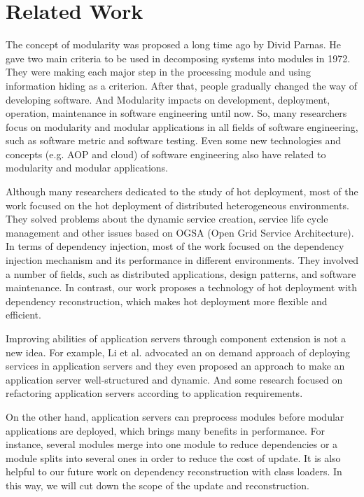 \documentclass[conference]{IEEEtran}
\begin{document}
\section{Related Work\label{sec:relatedwork}}

The concept of modularity was proposed a long time ago by Divid Parnas\cite{Divid_specification}.
He gave two main criteria\cite{Divid_criteria} to be used in decomposing systems into modules in 1972.
They were making each major step in the processing module and using information hiding as a criterion.
After that, people gradually changed the way of developing software.
And Modularity impacts on development, deployment, operation, maintenance in software engineering until now.
So, many researchers focus on modularity and modular applications in all fields of software engineering, such as software metric\cite{module_metric} and software testing\cite{module_test}.
Even some new technologies and concepts (e.g. AOP\cite{module_aop} and cloud\cite{module_cloud}) of software engineering also have related to modularity and modular applications.

Although many researchers dedicated to the study of hot deployment, most of the work focused on the hot deployment of distributed heterogeneous environments\cite{related_hot_1, related_hot_2, related_hot_3, related_hot_4}.
They solved problems about the dynamic service creation, service life cycle management and other issues based on OGSA (Open Grid Service Architecture).
In terms of dependency injection, most of the work focused on the dependency injection mechanism and its performance in different environments\cite{related_DI_1, related_DI_2, related_DI_3}.
They involved a number of fields, such as distributed applications, design patterns, and software maintenance.
In contrast, our work proposes a technology of hot deployment with dependency reconstruction, which makes hot deployment more flexible and efficient.

Improving abilities of application servers through component extension is not a new idea.
For example, Li et al. advocated an on demand approach of deploying services in application servers\cite{related_AS_1} and they even proposed an approach to make an application server well-structured and dynamic\cite{related_AS_2}.
And some research focused on refactoring application servers according to application requirements\cite{related_AS_3}.
	
On the other hand, application servers can preprocess modules before modular applications are deployed, which brings many benefits in performance. 
For instance, several modules merge into one module to reduce dependencies\cite{related_merge} or a module splits into several ones in order to reduce the cost of update\cite{related_split}.
It is also helpful to our future work on dependency reconstruction with class loaders.
In this way, we will cut down the scope of the update and reconstruction.
\end{document}
